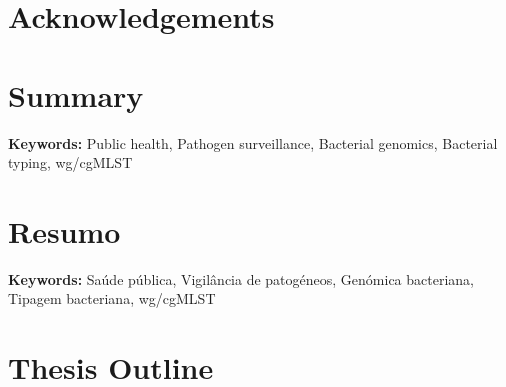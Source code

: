 \documentclass[12pt,a4paper,twoside,openright]{book}
\makeatletter
\def\cleardoublepage{\clearpage\if@twoside \ifodd\c@page\else
    \hbox{}
    \thispagestyle{plain}
    \newpage
    \if@twocolumn\hbox{}\newpage\fi\fi\fi}
\providecommand{\keywords}[1]{\textbf{Keywords:} #1}
\makeatother
\begin{document}
\begin{sloppy}
\newpage
\thispagestyle{plain}
\chapter*{Acknowledgements}

\clearpage \thispagestyle{empty}\mbox{}\clearpage
\cleardoublepage

\newpage
\thispagestyle{plain}
\chapter*{Summary}


\keywords{Public health, Pathogen surveillance, Bacterial genomics, Bacterial typing, wg/cgMLST}
\clearpage \thispagestyle{empty}\mbox{}\clearpage
\cleardoublepage

\newpage
\thispagestyle{plain}
\chapter*{Resumo}


\keywords{Saúde pública, Vigilância de patogéneos, Genómica bacteriana, Tipagem bacteriana, wg/cgMLST}
\clearpage \thispagestyle{empty}\mbox{}\clearpage
\cleardoublepage

\newpage
\thispagestyle{plain}
\chapter*{Thesis Outline}

\clearpage \thispagestyle{empty}\mbox{}\clearpage
\cleardoublepage

\newpage
\thispagestyle{plain}

\end{sloppy}
\end{document}
